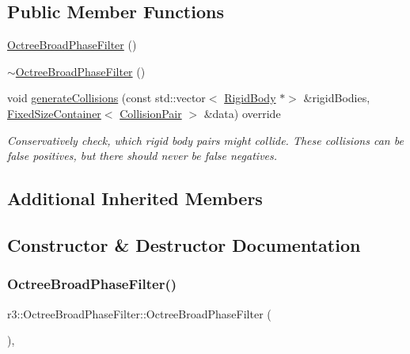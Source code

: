 \subsection*{Public Member Functions}
\begin{DoxyCompactItemize}
\item 
\mbox{\hyperlink{classr3_1_1_octree_broad_phase_filter_af7c42e2915074abe284799b250079100}{Octree\+Broad\+Phase\+Filter}} ()
\item 
\mbox{\hyperlink{classr3_1_1_octree_broad_phase_filter_abf83846bc8ecbc65647cd46c63f87e08}{$\sim$\+Octree\+Broad\+Phase\+Filter}} ()
\item 
void \mbox{\hyperlink{classr3_1_1_octree_broad_phase_filter_a9a4a5bbdcb978c782b89b729c475abfa}{generate\+Collisions}} (const std\+::vector$<$ \mbox{\hyperlink{classr3_1_1_rigid_body}{Rigid\+Body}} $\ast$$>$ \&rigid\+Bodies, \mbox{\hyperlink{classr3_1_1_fixed_size_container}{Fixed\+Size\+Container}}$<$ \mbox{\hyperlink{classr3_1_1_collision_pair}{Collision\+Pair}} $>$ \&data) override
\begin{DoxyCompactList}\small\item\em Conservatively check, which rigid body pairs might collide. These collisions can be false positives, but there should never be false negatives. \end{DoxyCompactList}\end{DoxyCompactItemize}
\subsection*{Additional Inherited Members}


\subsection{Constructor \& Destructor Documentation}
\mbox{\label{classr3_1_1_octree_broad_phase_filter_af7c42e2915074abe284799b250079100}} 
\subsubsection{\texorpdfstring{Octree\+Broad\+Phase\+Filter()}{OctreeBroadPhaseFilter()}}
{\footnotesize\ttfamily r3\+::\+Octree\+Broad\+Phase\+Filter\+::\+Octree\+Broad\+Phase\+Filter (\begin{DoxyParamCaption}{ }\end{DoxyParamCaption})\hspace{0.3cm}{\ttfamily [explicit]}, {\ttfamily [default]}}

